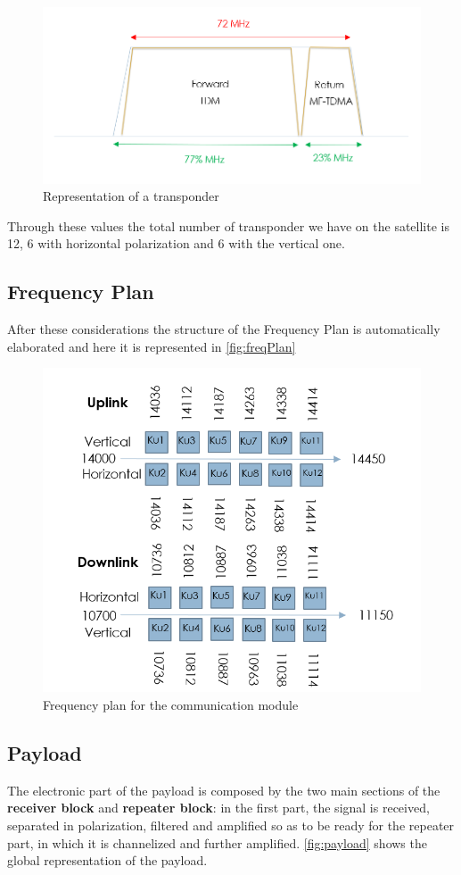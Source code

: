\documentclass[11pt,a4paper,titlepage]{article}
\begin{document}
		\begin{figure}
		\centering
		\includegraphics[width = .8\textwidth]{Transponder.png}
		\caption{Representation of a transponder}
		\label{fig:transp}
		\end{figure}

		Through these values the total number of transponder we have on the satellite is 12, 6 with horizontal polarization and 6 with the vertical one.

	\subsection{Frequency Plan}
After these considerations the structure of the Frequency Plan is automatically elaborated and here it is represented in \autoref{fig:freqPlan}

		\begin{figure}
		\centering
		\includegraphics[width = .65\textwidth]{Frequencies.png}
		\caption{Frequency plan for the communication module}
		\label{fig:freqPlan}
		\end{figure}

	\subsection{Payload}
		The electronic part of the payload is composed by the two main sections of the \textbf{receiver block} and \textbf{repeater block}: in the first part, the signal is received, separated in polarization, filtered and amplified so as to be ready for the repeater part, in which it is channelized and further amplified. \autoref{fig:payload} shows the global representation of the payload.
\end{document}
